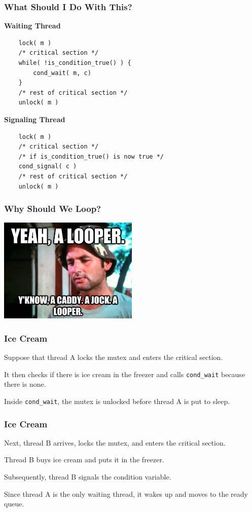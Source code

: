 \begin{frame}[fragile]
	\frametitle{What Should I Do With This?}

	\textbf{Waiting Thread}
	\begin{verbatim}
	lock( m )
	/* critical section */
	while( !is_condition_true() ) {
	    cond_wait( m, c)
	}
	/* rest of critical section */
	unlock( m )
	\end{verbatim}

	\vspace{2em}

	\textbf{Signaling Thread}
	\begin{verbatim}
	lock( m )
	/* critical section */
	/* if is_condition_true() is now true */
	cond_signal( c )
	/* rest of critical section */
	unlock( m )
	\end{verbatim}

\end{frame}

\begin{frame}[fragile]
	\frametitle{Why Should We Loop?}

	\begin{center}
		\includegraphics[width=0.5\textwidth]{images/looper.jpg}
	\end{center}

\end{frame}

\begin{frame}[fragile]
	\frametitle{Ice Cream}

	Suppose that thread A locks the mutex and enters the critical section.

	It then checks if there is ice cream in the freezer and calls \texttt{cond\_wait} because there is none.

	Inside \texttt{cond\_wait}, the mutex is unlocked before thread A is put to sleep.

\end{frame}

\begin{frame}[fragile]
	\frametitle{Ice Cream}

	Next, thread B arrives, locks the mutex, and enters the critical section.

	Thread B buys ice cream and puts it in the freezer.

	Subsequently, thread B signals the condition variable.

	Since thread A is the only waiting thread, it wakes up and moves to the ready queue.

\end{frame}

